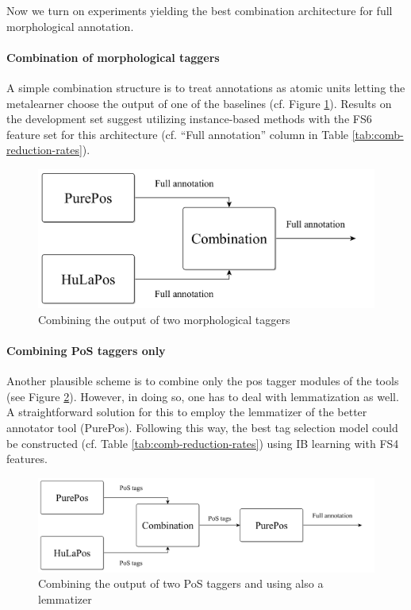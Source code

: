 Now we turn on experiments yielding the best combination architecture for full morphological annotation.

\paragraph{Combination of morphological taggers}

A simple combination structure is to treat annotations as atomic units letting the metalearner choose the output of one of the baselines (cf. Figure \ref{fig:comb1}).
Results on the development set suggest utilizing instance-based methods with the FS6 feature set for this architecture (cf. ``Full annotation'' column in Table \ref{tab:comb-reduction-rates}). 

\begin{figure}[H]
  \centering
  \includegraphics[scale=0.2]{MorphTagging/comb1.png} 
  \caption{Combining the output of two morphological taggers}
  \label{fig:comb1}
\end{figure}

\paragraph{Combining PoS taggers only}

Another plausible scheme is to combine only the \acrshort{pos} tagger modules of the tools (see Figure \ref{fig:comb2}).
However, in doing so, one has to deal with lemmatization as well.
A straightforward solution for this to employ the lemmatizer of the better annotator tool (PurePos).
Following this way, the best tag selection model could be constructed (cf.
Table \ref{tab:comb-reduction-rates}) using IB learning with FS4 features.

\begin{figure}[H]
  \centering
  \includegraphics[scale=0.2]{MorphTagging/comb2.png} 
  \caption{Combining the output of two PoS taggers and using also a lemmatizer}
  \label{fig:comb2}
\end{figure}

